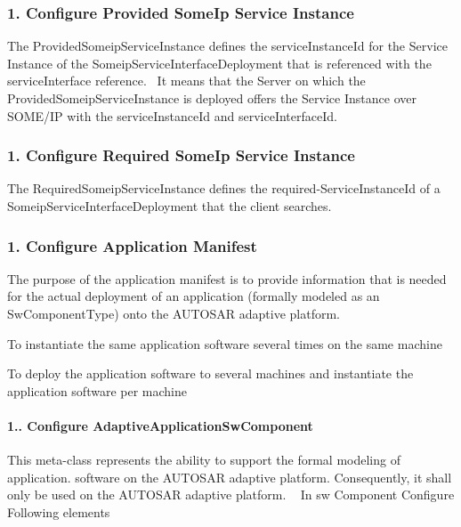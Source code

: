 \subsubsection*{1. Configure Provided Some\+Ip Service Instance}

The Provided\+Someip\+Service\+Instance defines the service\+Instance\+Id for the Service Instance of the Someip\+Service\+Interface\+Deployment that is referenced with the service\+Interface reference.~\newline
 It means that the Server on which the Provided\+Someip\+Service\+Instance is deployed offers the Service Instance over S\+O\+M\+E/\+IP with the service\+Instance\+Id and service\+Interface\+Id.



\subsubsection*{1. Configure Required Some\+Ip Service Instance}

The Required\+Someip\+Service\+Instance defines the required-\/\+Service\+Instance\+Id of a Someip\+Service\+Interface\+Deployment that the client searches.



\subsubsection*{1. Configure Application Manifest}

The purpose of the application manifest is to provide information that is needed for the actual deployment of an application (formally modeled as an Sw\+Component\+Type) onto the A\+U\+T\+O\+S\+AR adaptive platform.
\begin{DoxyItemize}
\item To instantiate the same application software several times on the same machine
\item To deploy the application software to several machines and instantiate the application software per machine
\end{DoxyItemize}

\paragraph*{1.. Configure Adaptive\+Application\+Sw\+Component}

This meta-\/class represents the ability to support the formal modeling of application. software on the A\+U\+T\+O\+S\+AR adaptive platform. Consequently, it shall only be used on the A\+U\+T\+O\+S\+AR adaptive platform. ~\newline
 In sw Component Configure Following elements ~\newline

